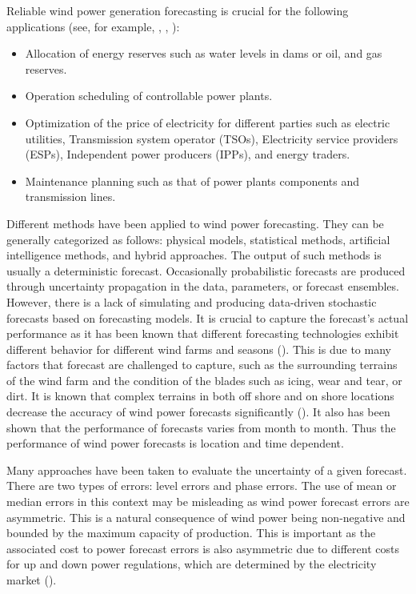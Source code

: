\documentclass[11pt]{article}
\theoremstyle{definition}
\begin{document}
Reliable wind power generation forecasting is crucial for the following applications (see, for example, \cite[5]{gieb}, \cite[162]{chang}, \cite{zhbo}):
\begin{itemize}
\item Allocation of energy reserves such as water levels in dams or oil, and gas reserves.
\item Operation scheduling of controllable power plants.
\item Optimization of the price of electricity for different parties such as electric utilities, Transmission system operator (TSOs), Electricity service providers (ESPs), Independent power producers (IPPs), and energy traders.
\item Maintenance planning such as that of power plants components and transmission lines.

\end{itemize}

Different methods have been applied to wind power forecasting. They can be generally categorized as follows: physical models, statistical methods, artificial intelligence methods, and hybrid approaches. The output of such methods is usually a deterministic forecast. Occasionally probabilistic forecasts are produced through uncertainty propagation in the data, parameters, or forecast ensembles. 
However, there is a lack of simulating and producing data-driven stochastic forecasts based on forecasting models. It is crucial to capture the forecast's actual performance as it has been known that different forecasting technologies exhibit different behavior for different wind farms and seasons (\cite{chang}). This is due to many factors that forecast are challenged to capture, such as the surrounding terrains of the wind farm and the condition of the blades such as icing, wear and tear, or dirt. It is known that complex terrains in both off shore and on shore locations decrease the accuracy of wind power forecasts significantly (\cite{schicker2017short}). It also has been shown that the performance of forecasts varies from month to month. Thus the performance of wind power forecasts is location and time dependent.

Many approaches have been taken to evaluate the uncertainty of a given forecast. There are two types of errors: level errors and phase errors. The use of mean or median errors in this context may be misleading as wind power forecast errors are asymmetric. This is a natural consequence of wind power being non-negative and bounded by the maximum capacity of production. This is important as the associated cost to power forecast errors is also asymmetric due to different costs for up and down power regulations, which are determined by the electricity market (\cite{tsitsiklis2015pricing}).
\end{document}
